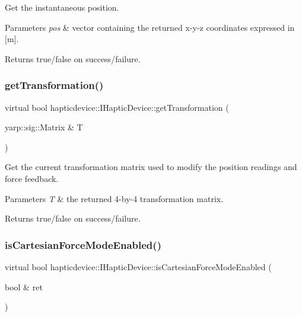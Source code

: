 Get the instantaneous position. 


\begin{DoxyParams}{Parameters}
{\em pos} & vector containing the returned x-\/y-\/z coordinates expressed in \mbox{[}m\mbox{]}. \\
\hline
\end{DoxyParams}
\begin{DoxyReturn}{Returns}
true/false on success/failure. 
\end{DoxyReturn}
\label{classhapticdevice_1_1IHapticDevice_a9bbb65a62a31e0f52f21c2eb13671483} 
\subsubsection{\texorpdfstring{get\+Transformation()}{getTransformation()}}
{\footnotesize\ttfamily virtual bool hapticdevice\+::\+I\+Haptic\+Device\+::get\+Transformation (\begin{DoxyParamCaption}\item[{yarp\+::sig\+::\+Matrix \&}]{T }\end{DoxyParamCaption})\hspace{0.3cm}{\ttfamily [pure virtual]}}



Get the current transformation matrix used to modify the position readings and force feedback. 


\begin{DoxyParams}{Parameters}
{\em T} & the returned 4-\/by-\/4 transformation matrix. \\
\hline
\end{DoxyParams}
\begin{DoxyReturn}{Returns}
true/false on success/failure. 
\end{DoxyReturn}
\label{classhapticdevice_1_1IHapticDevice_a1a6cbd5d7db5e36dbcd686b94a6b67ab} 
\subsubsection{\texorpdfstring{is\+Cartesian\+Force\+Mode\+Enabled()}{isCartesianForceModeEnabled()}}
{\footnotesize\ttfamily virtual bool hapticdevice\+::\+I\+Haptic\+Device\+::is\+Cartesian\+Force\+Mode\+Enabled (\begin{DoxyParamCaption}\item[{bool \&}]{ret }\end{DoxyParamCaption})\hspace{0.3cm}{\ttfamily [pure virtual]}}



